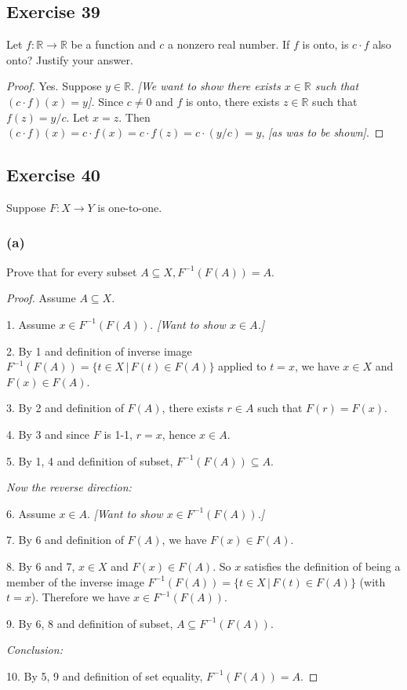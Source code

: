 \documentclass[14pt]{extarticle}
\newcommand{\R}{\mathbb{R}}
\begin{document}
\subsection{Exercise 39}
Let \(f: \R \to \R\) be a function and $c$ a nonzero real number. If $f$ is onto, is \(c \cdot f\) also onto? 
Justify your answer.

\begin{proof}
Yes. Suppose \(y \in \R\). {\it [We want to show there exists \(x \in \R\) such that \((c \cdot f)(x) = y\)].}
Since \(c \neq 0\) and $f$ is onto, there exists \(z \in \R\) such that \(f(z) = y/c\). Let $x = z$. Then 
\((c \cdot f)(x) = c \cdot f(x) = c \cdot f(z) = c \cdot (y/c) = y\), {\it [as was to be shown]}.
\end{proof}

\subsection{Exercise 40}
Suppose \(F: X \to Y\) is one-to-one.

\subsubsection{(a)}
Prove that for every subset \(A \subseteq X, F^{-1}(F(A)) = A\).

\begin{proof}
Assume \(A \subseteq X\).

1. Assume \(x \in F^{-1}(F(A))\). {\it [Want to show \(x \in A\).]}

2. By 1 and definition of inverse image \(F^{-1}(F(A)) = \{t \in X \, | \, F(t) \in F(A)\}\) applied to $t = x$, we have \(x \in X\) and \(F(x) \in F(A)\).

3. By 2 and definition of $F(A)$, there exists \(r \in A\) such that \(F(r) = F(x)\).

4. By 3 and since $F$ is 1-1, $r = x$, hence \(x \in A\).

5. By 1, 4 and definition of subset, \(F^{-1}(F(A)) \subseteq A\).

{\it Now the reverse direction:}

6. Assume \(x \in A\). {\it [Want to show \(x \in F^{-1}(F(A))\).]}

7. By 6 and definition of $F(A)$, we have \(F(x) \in F(A)\).

8. By 6 and 7, \(x \in X\) and \(F(x) \in F(A)\). So $x$ satisfies the definition of being a member of the inverse 
image \(F^{-1}(F(A)) = \{t \in X \, | \, F(t) \in F(A)\}\) (with $t = x$). Therefore we have \(x \in F^{-1}(F(A))\).

9. By 6, 8 and definition of subset, \(A \subseteq F^{-1}(F(A))\).

{\it Conclusion:}

10. By 5, 9 and definition of set equality, \(F^{-1}(F(A)) = A\).
\end{proof}
\end{document}
